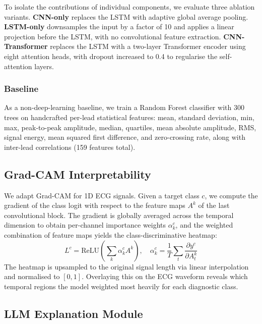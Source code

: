 \documentclass[10pt]{article}
\begin{document}
To isolate the contributions of individual components, we evaluate three ablation variants. \textbf{CNN-only} replaces the LSTM with adaptive global average pooling. \textbf{LSTM-only} downsamples the input by a factor of 10 and applies a linear projection before the LSTM, with no convolutional feature extraction. \textbf{CNN-Transformer} replaces the LSTM with a two-layer Transformer encoder \citep{vaswani2017attention} using eight attention heads, with dropout increased to 0.4 to regularise the self-attention layers.

\subsubsection{Baseline}

As a non-deep-learning baseline, we train a Random Forest classifier \citep{breiman2001random} with 300 trees on handcrafted per-lead statistical features: mean, standard deviation, min, max, peak-to-peak amplitude, median, quartiles, mean absolute amplitude, RMS, signal energy, mean squared first difference, and zero-crossing rate, along with inter-lead correlations (159 features total).

\subsection{Grad-CAM Interpretability}

We adapt Grad-CAM \citep{selvaraju2017gradcam} for 1D ECG signals. Given a target class $c$, we compute the gradient of the class logit with respect to the feature maps $A^k$ of the last convolutional block. The gradient is globally averaged across the temporal dimension to obtain per-channel importance weights $\alpha_k^c$, and the weighted combination of feature maps yields the class-discriminative heatmap:
\begin{equation}
    L^c = \text{ReLU}\left(\sum_k \alpha_k^c A^k\right), \quad \alpha_k^c = \frac{1}{T} \sum_t \frac{\partial y^c}{\partial A^k_t}
\end{equation}
The heatmap is upsampled to the original signal length via linear interpolation and normalised to $[0, 1]$. Overlaying this on the ECG waveform reveals which temporal regions the model weighted most heavily for each diagnostic class.

\subsection{LLM Explanation Module}
\end{document}
